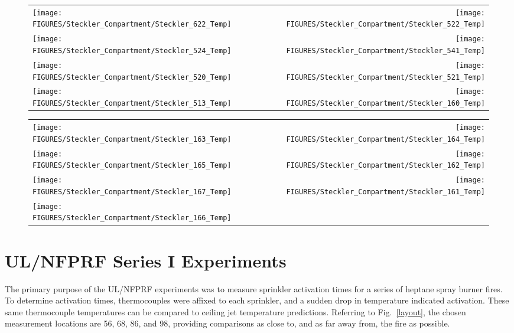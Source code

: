 \begin{figure}[p]
\begin{tabular*}{\textwidth}{l@{\extracolsep{\fill}}r}
\texttt{[image: FIGURES/Steckler\_Compartment/Steckler\_622\_Temp]} &
\texttt{[image: FIGURES/Steckler\_Compartment/Steckler\_522\_Temp]} \\
 \texttt{[image: FIGURES/Steckler\_Compartment/Steckler\_524\_Temp]} &
\texttt{[image: FIGURES/Steckler\_Compartment/Steckler\_541\_Temp]} \\
\texttt{[image: FIGURES/Steckler\_Compartment/Steckler\_520\_Temp]} &
\texttt{[image: FIGURES/Steckler\_Compartment/Steckler\_521\_Temp]} \\
\texttt{[image: FIGURES/Steckler\_Compartment/Steckler\_513\_Temp]} &
\texttt{[image: FIGURES/Steckler\_Compartment/Steckler\_160\_Temp]}
\end{tabular*}
\label{Steckler_Temp_6}
\end{figure}

\begin{figure}[p]
\begin{tabular*}{\textwidth}{l@{\extracolsep{\fill}}r}
\texttt{[image: FIGURES/Steckler\_Compartment/Steckler\_163\_Temp]} &
\texttt{[image: FIGURES/Steckler\_Compartment/Steckler\_164\_Temp]} \\
\texttt{[image: FIGURES/Steckler\_Compartment/Steckler\_165\_Temp]} &
\texttt{[image: FIGURES/Steckler\_Compartment/Steckler\_162\_Temp]} \\
\texttt{[image: FIGURES/Steckler\_Compartment/Steckler\_167\_Temp]} &
\texttt{[image: FIGURES/Steckler\_Compartment/Steckler\_161\_Temp]} \\
\texttt{[image: FIGURES/Steckler\_Compartment/Steckler\_166\_Temp]} &
\end{tabular*}
\label{Steckler_Temp_7}
\end{figure}

\clearpage

\section{UL/NFPRF Series I Experiments}

The primary purpose of the UL/NFPRF experiments was to measure sprinkler activation times for a series of heptane spray burner fires. To determine activation times, thermocouples were affixed to each sprinkler, and a sudden drop in temperature indicated activation. These same thermocouple temperatures can be compared to ceiling jet temperature predictions. Referring to Fig.~\ref{layout}, the chosen measurement locations are 56, 68, 86, and 98, providing comparisons as close to, and as far away from, the fire as possible.


